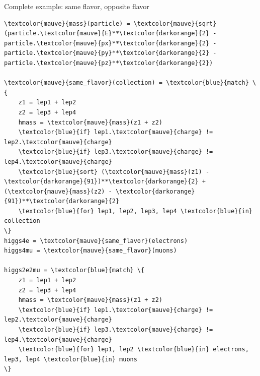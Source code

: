 \documentclass[aspectratio=169]{beamer}
\begin{document}
\begin{frame}[fragile]{Complete example: same flavor, opposite flavor}
\scriptsize
\vspace{0.25 cm}
\begin{Verbatim}[commandchars=\\\{\}]
\textcolor{mauve}{mass}(particle) = \textcolor{mauve}{sqrt}(particle.\textcolor{mauve}{E}**\textcolor{darkorange}{2} - particle.\textcolor{mauve}{px}**\textcolor{darkorange}{2} - particle.\textcolor{mauve}{py}**\textcolor{darkorange}{2} - particle.\textcolor{mauve}{pz}**\textcolor{darkorange}{2})

\textcolor{mauve}{same_flavor}(collection) = \textcolor{blue}{match} \{
    z1 = lep1 + lep2
    z2 = lep3 + lep4
    hmass = \textcolor{mauve}{mass}(z1 + z2)
    \textcolor{blue}{if} lep1.\textcolor{mauve}{charge} != lep2.\textcolor{mauve}{charge}
    \textcolor{blue}{if} lep3.\textcolor{mauve}{charge} != lep4.\textcolor{mauve}{charge}
    \textcolor{blue}{sort} (\textcolor{mauve}{mass}(z1) - \textcolor{darkorange}{91})**\textcolor{darkorange}{2} + (\textcolor{mauve}{mass}(z2) - \textcolor{darkorange}{91})**\textcolor{darkorange}{2}
    \textcolor{blue}{for} lep1, lep2, lep3, lep4 \textcolor{blue}{in} collection
\}
higgs4e = \textcolor{mauve}{same_flavor}(electrons)
higgs4mu = \textcolor{mauve}{same_flavor}(muons)

higgs2e2mu = \textcolor{blue}{match} \{
    z1 = lep1 + lep2
    z2 = lep3 + lep4
    hmass = \textcolor{mauve}{mass}(z1 + z2)
    \textcolor{blue}{if} lep1.\textcolor{mauve}{charge} != lep2.\textcolor{mauve}{charge}
    \textcolor{blue}{if} lep3.\textcolor{mauve}{charge} != lep4.\textcolor{mauve}{charge}
    \textcolor{blue}{for} lep1, lep2 \textcolor{blue}{in} electrons, lep3, lep4 \textcolor{blue}{in} muons
\}
\end{Verbatim}
\end{frame}
\end{document}
